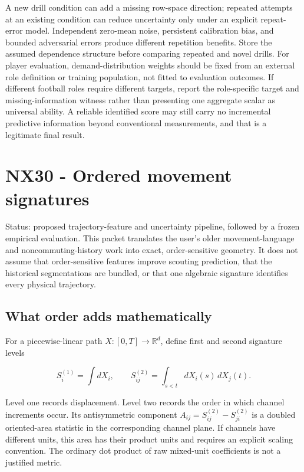 \documentclass[
  11pt,
  a4paper,
]{report}
\begin{document}
A new drill condition can add a missing row-space direction; repeated
attempts at an existing condition can reduce uncertainty only under an
explicit repeat-error model. Independent zero-mean noise, persistent
calibration bias, and bounded adversarial errors produce different
repetition benefits. Store the assumed dependence structure before
comparing repeated and novel drills. For player evaluation,
demand-distribution weights should be fixed from an external role
definition or training population, not fitted to evaluation outcomes. If
different football roles require different targets, report the
role-specific target and missing-information witness rather than
presenting one aggregate scalar as universal ability. A reliable
identified score may still carry no incremental predictive information
beyond conventional measurements, and that is a legitimate final result.

\hypertarget{nx30---ordered-movement-signatures}{%
\chapter{NX30 - Ordered movement
signatures}\label{nx30---ordered-movement-signatures}}

Status: proposed trajectory-feature and uncertainty pipeline, followed
by a frozen empirical evaluation. This packet translates the user's
older movement-language and noncommuting-history work into exact,
order-sensitive geometry. It does not assume that order-sensitive
features improve scouting prediction, that the historical segmentations
are bundled, or that one algebraic signature identifies every physical
trajectory.

\hypertarget{what-order-adds-mathematically}{%
\section{What order adds
mathematically}\label{what-order-adds-mathematically}}

For a piecewise-linear path \(X:[0,T]\to\mathbb R^d\), define first and
second signature levels

\[
 S_i^{(1)}=\int dX_i,\qquad
 S_{ij}^{(2)}=\int_{s<t}dX_i(s)\,dX_j(t).
\]

Level one records displacement. Level two records the order in which
channel increments occur. Its antisymmetric component
\(A_{ij}=S_{ij}^{(2)}-S_{ji}^{(2)}\) is a doubled oriented-area
statistic in the corresponding channel plane. If channels have different
units, this area has their product units and requires an explicit
scaling convention. The ordinary dot product of raw mixed-unit
coefficients is not a justified metric.
\end{document}
